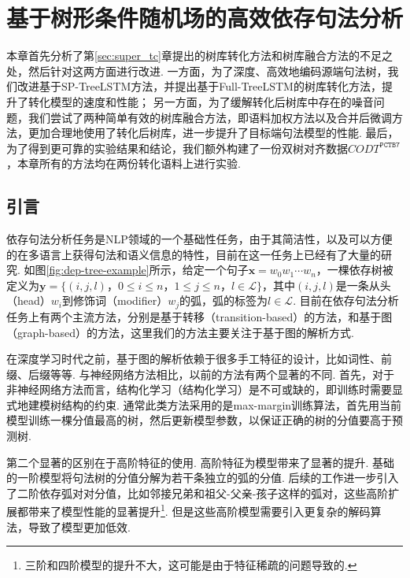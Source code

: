 \chapter{基于树形条件随机场的高效依存句法分析}
本章首先分析了第\ref{sec:super_tc}章提出的树库转化方法和树库融合方法的不足之处，然后针对这两方面进行改进.
一方面，为了深度、高效地编码源端句法树，我们改进基于SP-TreeLSTM方法，并提出基于Full-TreeLSTM的树库转化方法，提升了转化模型的速度和性能；
另一方面，为了缓解转化后树库中存在的噪音问题，我们尝试了两种简单有效的树库融合方法，即语料加权方法以及合并后微调方法，更加合理地使用了转化后树库，进一步提升了目标端句法模型的性能.
最后，为了得到更可靠的实验结果和结论，我们额外构建了一份双树对齐数据$CODT^{\texttt{PCTB7}}$，本章所有的方法均在两份转化语料上进行实验.

\section{引言}

依存句法分析任务是NLP领域的一个基础性任务，由于其简洁性，以及可以方便的在多语言上获得句法和语义信息的特性，目前在这一任务上已经有了大量的研究. 如图\ref{fig:dep-tree-example}所示，给定一个句子$\boldsymbol{x}=w_0w_1\cdots w_n$，一棵依存树被定义为$\boldsymbol{y}=\{(i,j,l)，0\le i \le n，1 \le j \le n，l \in \mathcal{L}\}$，其中$(i,j,l)$是一条从头（head）$w_i$到修饰词（modifier）$w_j$的弧，弧的标签为$l \in \mathcal{L}$. 目前在依存句法分析任务上有两个主流方法，分别是基于转移（transition-based）的方法，和基于图（graph-based）的方法，这里我们的方法主要关注于基于图的解析方式.

在深度学习时代之前，基于图的解析依赖于很多手工特征的设计，比如词性、前缀、后缀等等.
与神经网络方法相比，以前的方法有两个显著的不同.
首先，对于非神经网络方法而言，结构化学习（结构化学习）是不可或缺的，即训练时需要显式地建模树结构的约束.
通常此类方法采用的是max-margin训练算法，首先用当前模型训练一棵分值最高的树，然后更新模型参数，以保证正确的树的分值要高于预测树.

第二个显著的区别在于高阶特征的使用. 高阶特征为模型带来了显著的提升.
基础的一阶模型将句法树的分值分解为若干条独立的弧的分值\cite{mcdonald-etal-2005-online}. 后续的工作进一步引入了二阶依存弧对对分值，比如邻接兄弟\cite{mcdonald-pereira-2006-online}和祖父-父亲-孩子这样的弧对\cite{carreras-2007-experiments,koo-collins-2010-efficient}，这些高阶扩展都带来了模型性能的显著提升\footnote{三阶和四阶模型的提升不大，这可能是由于特征稀疏的问题导致的\cite{koo-collins-2010-efficient,ma-zhao-2012-fourth}.}. 但是这些高阶模型需要引入更复杂的解码算法，导致了模型更加低效.


